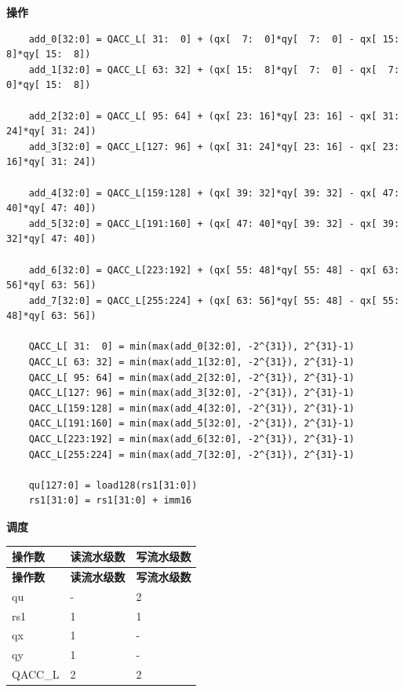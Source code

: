 \textbf{操作}\\
\begin{lstlisting}
    add_0[32:0] = QACC_L[ 31:  0] + (qx[  7:  0]*qy[  7:  0] - qx[ 15:  8]*qy[ 15:  8])
    add_1[32:0] = QACC_L[ 63: 32] + (qx[ 15:  8]*qy[  7:  0] - qx[  7:  0]*qy[ 15:  8])

    add_2[32:0] = QACC_L[ 95: 64] + (qx[ 23: 16]*qy[ 23: 16] - qx[ 31: 24]*qy[ 31: 24])
    add_3[32:0] = QACC_L[127: 96] + (qx[ 31: 24]*qy[ 23: 16] - qx[ 23: 16]*qy[ 31: 24])

    add_4[32:0] = QACC_L[159:128] + (qx[ 39: 32]*qy[ 39: 32] - qx[ 47: 40]*qy[ 47: 40])
    add_5[32:0] = QACC_L[191:160] + (qx[ 47: 40]*qy[ 39: 32] - qx[ 39: 32]*qy[ 47: 40])

    add_6[32:0] = QACC_L[223:192] + (qx[ 55: 48]*qy[ 55: 48] - qx[ 63: 56]*qy[ 63: 56])
    add_7[32:0] = QACC_L[255:224] + (qx[ 63: 56]*qy[ 55: 48] - qx[ 55: 48]*qy[ 63: 56])

    QACC_L[ 31:  0] = min(max(add_0[32:0], -2^{31}), 2^{31}-1)
    QACC_L[ 63: 32] = min(max(add_1[32:0], -2^{31}), 2^{31}-1)
    QACC_L[ 95: 64] = min(max(add_2[32:0], -2^{31}), 2^{31}-1)
    QACC_L[127: 96] = min(max(add_3[32:0], -2^{31}), 2^{31}-1)
    QACC_L[159:128] = min(max(add_4[32:0], -2^{31}), 2^{31}-1)
    QACC_L[191:160] = min(max(add_5[32:0], -2^{31}), 2^{31}-1)
    QACC_L[223:192] = min(max(add_6[32:0], -2^{31}), 2^{31}-1)
    QACC_L[255:224] = min(max(add_7[32:0], -2^{31}), 2^{31}-1)

    qu[127:0] = load128(rs1[31:0])
    rs1[31:0] = rs1[31:0] + imm16
\end{lstlisting}

\textbf{调度}\\
\begin{longtable}[c]{|l|l|l|}
    \hline
    \rowcolor{lightgray}
    \textbf{操作数} & \textbf{读流水级数} & \textbf{写流水级数} \\\hline
    \endfirsthead
    \hline
    \rowcolor{lightgray}
     \textbf{操作数} & \textbf{读流水级数} & \textbf{写流水级数} \\\hline
    \endhead
    \hline
    \endfoot

    qu & - & 2 \\\hline
    rs1 & 1 & 1 \\\hline
     qx & 1 & - \\\hline
     qy & 1 & - \\\hline
     QACC\_L & 2 & 2

\end{longtable}


